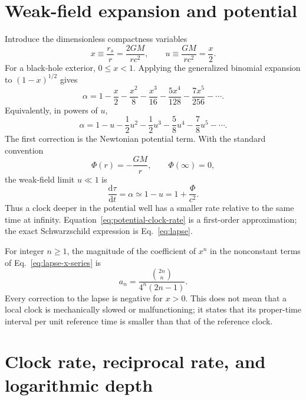 \documentclass[12pt]{article}
\begin{document}
\section{Weak-field expansion and potential}

Introduce the dimensionless compactness variables
\begin{equation}
  x\equiv\frac{r_s}{r}=\frac{2GM}{rc^2},
  \qquad
  u\equiv\frac{GM}{rc^2}=\frac{x}{2}.
  \label{eq:compactness}
\end{equation}
For a black-hole exterior, $0\le x<1$. Applying the generalized binomial expansion \cite{DLMF} to $(1-x)^{1/2}$ gives
\begin{equation}
  \alpha
  =1-\frac{x}{2}-\frac{x^2}{8}-\frac{x^3}{16}
    -\frac{5x^4}{128}-\frac{7x^5}{256}-\cdots.
  \label{eq:lapse-x-series}
\end{equation}
Equivalently, in powers of $u$,
\begin{equation}
  \alpha
  =1-u-\frac{1}{2}u^2-\frac{1}{2}u^3
    -\frac{5}{8}u^4-\frac{7}{8}u^5-\cdots.
  \label{eq:lapse-u-series}
\end{equation}
The first correction is the Newtonian potential term. With the standard convention
\begin{equation}
  \Phi(r)=-\frac{GM}{r},
  \qquad \Phi(\infty)=0,
  \label{eq:newtonian-potential}
\end{equation}
the weak-field limit $u\ll1$ is
\begin{equation}
  \frac{\mathrm{d}\tau}{\mathrm{d}t}
  =\alpha\simeq1-u
  =1+\frac{\Phi}{c^2}.
  \label{eq:potential-clock-rate}
\end{equation}
Thus a clock deeper in the potential well has a smaller rate relative to the same time at infinity. Equation~\eqref{eq:potential-clock-rate} is a first-order approximation; the exact Schwarzschild expression is Eq.~\eqref{eq:lapse}.

For integer $n\ge1$, the magnitude of the coefficient of $x^n$ in the nonconstant terms of Eq.~\eqref{eq:lapse-x-series} is
\begin{equation}
  a_n=\frac{\binom{2n}{n}}{4^n(2n-1)}.
  \label{eq:lapse-coefficients}
\end{equation}
Every correction to the lapse is negative for $x>0$. This does not mean that a local clock is mechanically slowed or malfunctioning; it states that its proper-time interval per unit reference time is smaller than that of the reference clock.

\section{Clock rate, reciprocal rate, and logarithmic depth}
\end{document}
